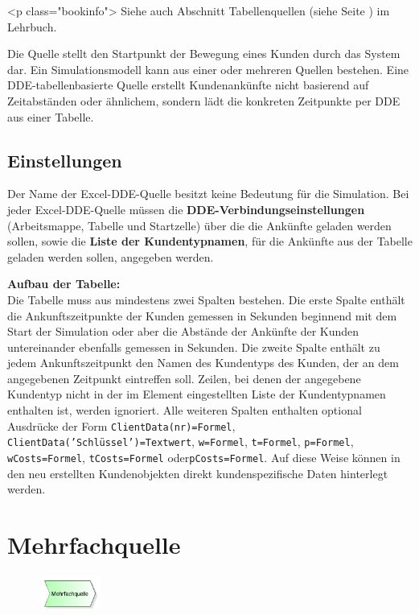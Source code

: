 <p class="bookinfo">
Siehe auch Abschnitt Tabellenquellen (siehe Seite \pageref{ref:book:9.3.1}) im Lehrbuch.

Die Quelle stellt den Startpunkt der Bewegung eines Kunden durch das System dar.
Ein Simulationsmodell kann aus einer oder mehreren Quellen bestehen.
Eine DDE-tabellenbasierte Quelle erstellt Kundenankünfte nicht basierend auf
Zeitabständen oder ähnlichem, sondern lädt die konkreten Zeitpunkte per DDE
aus einer Tabelle.

\subsection*{Einstellungen}

Der Name der Excel-DDE-Quelle besitzt keine Bedeutung für die Simulation.
Bei jeder Excel-DDE-Quelle müssen die \textbf{DDE-Verbindungseinstellungen}
(Arbeitsmappe, Tabelle und Startzelle) über die die Ankünfte geladen werden sollen,
sowie die \textbf{Liste der Kundentypnamen},
für die Ankünfte aus der Tabelle geladen werden sollen, angegeben werden.

\textbf{Aufbau der Tabelle:}~\\
Die Tabelle muss aus mindestens zwei Spalten bestehen. Die erste Spalte enthält die Ankunftszeitpunkte
der Kunden gemessen in Sekunden beginnend mit dem Start der Simulation oder aber die Abstände
der Ankünfte der Kunden untereinander ebenfalls gemessen in Sekunden. Die zweite Spalte
enthält zu jedem Ankunftszeitpunkt den Namen des Kundentyps des Kunden, der an dem
angegebenen Zeitpunkt eintreffen soll. Zeilen, bei denen der angegebene Kundentyp
nicht in der im Element eingestellten Liste der Kundentypnamen enthalten ist, werden ignoriert.
Alle weiteren Spalten enthalten optional Ausdrücke der Form \texttt{ClientData(nr)=Formel},
\texttt{ClientData('Schlüssel')=Textwert}, \texttt{w=Formel}, \texttt{t=Formel},
\texttt{p=Formel}, \texttt{wCosts=Formel}, \texttt{tCosts=Formel} oder\texttt{pCosts=Formel}.
Auf diese Weise können in den neu erstellten Kundenobjekten direkt kundenspezifische Daten
hinterlegt werden.


\section{Mehrfachquelle}
\label{ref:ModelElementSourceMulti}

\begin{figure}
\vspace{-22pt}
\includegraphics[width=2cm]{imageModelElementSourceMulti.png}
\vspace{-22pt}
\end{figure}

